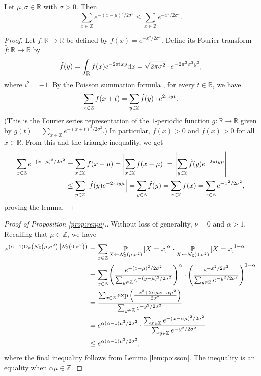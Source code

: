 \documentclass{jpcfinal} %
\newcommand{\ii}{\mathrm{i}\mkern1mu}
\newcommand{\dgausss}[2]{{\discN\left(#1,#2\right)}}
\newcommand{\pr}[2]{{\ifx&#1& \mathbb{P} \else
\underset{#1}{\mathbb{P}} \fi \left[#2\right]}}
\newcommand{\dr}[3]{\mathrm{D}_{#1}\left(#2\middle\|#3\right)}
\newcommand{\Z}{\mathbb{Z}}
\newcommand{\R}{\mathbb{R}}
\begin{document}
\begin{lem}\label{lem:poisson}
Let $\mu, \sigma \in \R$ with $\sigma>0$. Then 
\begin{equation}
\sum_{x \in \Z} e^{-(x-\mu)^2/2\sigma^2} \le \sum_{x \in \Z} e^{-x^2/2\sigma^2}.
\end{equation}
\end{lem}
\begin{proof}
Let $f\colon \R\to\R$ be defined by $f(x) = e^{-x^2/2\sigma^2}$. Define its Fourier transform $\hat{f}\colon \R \to \R$ by 
\[
    \hat{f}(y) = \int_\R f(x) e^{-2\pi\ii{}xy} \mathrm{d}x = \sqrt{2\pi\sigma^2} \cdot e^{-2\pi^2\sigma^2y^2},
\]
where $i^2=-1$.
By the Poisson summation formula \citep{poisson,poisson2}, for every $t\in\R$, we have 
\[
        \sum_{x\in\Z} f(x+t) = \sum_{y\in\Z} \hat{f}(y) \cdot e^{2\pi \ii y t}.
\]
(This is the Fourier series representation of the $1$-periodic function $g\colon \R \to \R$ given by $g(t) = \sum_{x\in\Z} e^{-(x+t)^2/2\sigma^2}$.)
In particular, $f(x)>0$ and $\hat{f}(x)>0$ for all $x \in \R$. From this and the triangle inequality, we get
\begin{align*}
    \sum_{x \in \Z} e^{-(x-\mu)^2/2\sigma^2} &=    \sum_{x\in\Z} f(x-\mu) 
    = \left| \sum_{x\in\Z} f(x-\mu) \right| 
    = \left| \sum_{y\in\Z} \hat{f}(y)e^{-2\pi \ii{} y \mu}\right| \\
    &\leq \sum_{y\in\Z} \left| \hat{f}(y)  e^{-2\pi \ii{} y \mu}\right|
    = \sum_{y\in\Z} \hat{f}(y) 
    = \sum_{x\in\Z} f(x) = \sum_{x \in \Z} e^{-x^2/2\sigma^2},
\end{align*}
proving the lemma.
\end{proof}

\begin{proof}[Proof of Proposition \ref{prop:renyi}.] Without loss of generality, $\nu=0$ and $\alpha>1$. Recalling that $\mu\in\Z$, we have
\begin{align*}
    e^{(\alpha-1)\dr{\alpha}{\dgausss{\mu}{\sigma^2}}{\dgausss{0}{\sigma^2}}} &= \sum_{x \in \Z} \pr{X \gets \dgausss{\mu}{\sigma^2}}{X=x}^\alpha \cdot \pr{X \gets \dgausss{0}{\sigma^2}}{X=x}^{1-\alpha}\\
    &= \sum_{x \in \Z} \left(\frac{e^{-(x-\mu)^2/2\sigma^2}}{\sum_{y \in \Z} e^{-(y-\mu)^2/2\sigma^2}}\right)^\alpha \cdot \left(\frac{e^{-x^2/2\sigma^2}}{\sum_{y \in \Z} e^{-y^2/2\sigma^2}}\right)^{1-\alpha}\\
    &= \frac{\sum_{x \in \Z}\exp\left(\frac{-x^2 +2\alpha\mu x -\alpha \mu^2}{2\sigma^2}\right)}{\sum_{y \in \Z} e^{-y^2/2\sigma^2}}\\
    &=  e^{\alpha(\alpha-1)\mu^2/2\sigma^2} \cdot \frac{\sum_{x \in \Z}e^{{-(x-\alpha\mu)^2}/{2\sigma^2}}}{\sum_{y \in \Z} e^{-y^2/2\sigma^2}}\\
    &\le e^{\alpha(\alpha-1)\mu^2/2\sigma^2},
\end{align*}
where the final inequality follows from Lemma \ref{lem:poisson}. The inequality is an equality when $\alpha\mu\in\Z$.
\end{proof}
\end{document}
